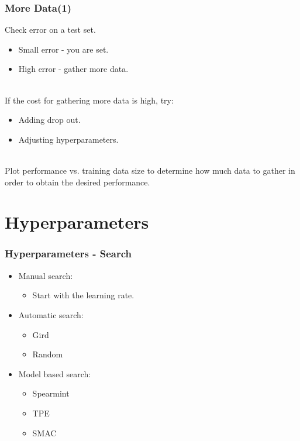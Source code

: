 \documentclass{beamer}
\begin{document}
\begin{frame}
    \frametitle{More Data(1)}
    Check error on a test set.
    \begin{itemize}
        \item Small error - you are set.
        \item High  error - gather more data.
    \end{itemize}

    ~\\ If the cost for gathering more data is high, try:
    \begin{itemize}
        \item Adding drop out.
        \item Adjusting hyperparameters.
    \end{itemize}

    ~\\ Plot performance vs. training data size to determine how much data to
    gather in order to obtain the desired performance.
\end{frame}

\section{Hyperparameters}\label{sec:hyperparameters}
\begin{frame}
    \frametitle{Hyperparameters - Search}
    \begin{itemize}
        \item Manual search:
            \begin{itemize}
                \item Start with the learning rate.
            \end{itemize}
        \item Automatic search:
            \begin{itemize}
                \item Gird
                \item Random
            \end{itemize}
        \item Model based search:
            \begin{itemize}
                \item Spearmint\cite{snoek-et-al-2016}
                \item TPE\cite{bergstar-et-al-2011}
                \item SMAC\cite{hutter-et-al-2011}
            \end{itemize}
    \end{itemize}
\end{frame}
\end{document}
